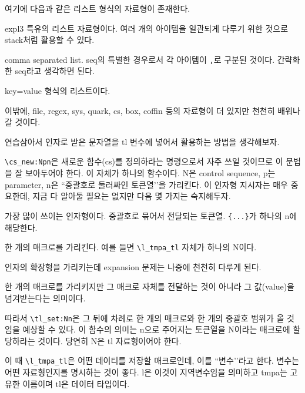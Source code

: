 \documentclass[a4paper,amsmath,itemph]{oblivoir}
\begin{document}
여기에 다음과 같은 리스트 형식의 자료형이 존재한다.
\begin{description}\firmlist
\item [sequence] expl3 특유의 리스트 자료형이다. 여러 개의 아이템을 일관되게 다루기 위한 것으로 stack처럼 활용할 수 있다.
\item [clist] comma separated list. seq의 특별한 경우로서 각 아이템이 \verb|,|로 구분된 것이다. 간략화한 seq라고 생각하면 된다.
\item [property list] key=value 형식의 리스트이다. 
\end{description}

이밖에, file, regex, sys, quark, cs, box, coffin 등의 자료형이 더 있지만 천천히 배워나갈 것이다.

\bigskip

연습삼아서 인자로 받은 문자열을 tl 변수에 넣어서 활용하는 방법을 생각해보자.

\medskip


\verb|\cs_new:Npn|은 새로운 함수(cs)를 정의하라는 명령으로서 자주 쓰일 것이므로 이 문법을 잘 보아두어야 한다.
이 자체가 하나의 함수이다. N은 control sequence, p는 parameter, n은 ``중괄호로 둘러싸인 토큰열’’을 가리킨다.
이 인자형 지시자는 매우 중요한데, 지금 다 알아둘 필요는 없지만 다음 몇 가지는 숙지해두자.

\begin{description}\firmlist
\item [n] 가장 많이 쓰이는 인자형이다. 중괄호로 묶어서 전달되는 토큰열. \verb|{...}|가 하나의 n에 해당한다.
\item [N] 한 개의 매크로를 가리킨다. 예를 들면 \verb|\l_tmpa_tl| 자체가 하나의 N이다.
\item [o, x, f, e] 인자의 확장형을 가리키는데 expansion 문제는 나중에 천천히 다루게 된다.
\item [V] 한 개의 매크로를 가리키지만 그 매크로 자체를 전달하는 것이 아니라 그 값(value)을 넘겨받는다는 의미이다.
\end{description}
따라서 \verb|\tl_set:Nn|은 그 뒤에 차례로 한 개의 매크로와 한 개의 중괄호 범위가 올 것임을 예상할 수 있다. 이 함수의 의미는 n으로 주어지는 토큰열을 N이라는 매크로에 할당하라는 것이다. 당연히 N은 tl 자료형이어야 한다.

이 때 \verb|\l_tmpa_tl|은 어떤 데이티를 저장할 매크로인데, 이를 ``변수’’라고 한다. 변수는 어떤 자료형인지를 명시하는 것이 좋다. l은 이것이 지역변수임을 의미하고 tmpa는 고유한 이름이며 tl은 데이터 타입이다.
\end{document}
